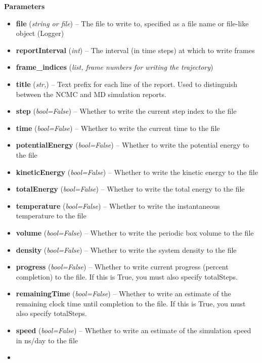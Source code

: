 \begin{description}
\begin{description}
\item
    \textbf{Parameters}
\begin{itemize}
\item
  \textbf{file} (\emph{string or file}) -- The file to write to,
  specified as a file name or file-like object (Logger)
\item
  \textbf{reportInterval} (\emph{int}) -- The interval (in time steps)
  at which to write frames
\item
  \textbf{frame\_indices} (\emph{list, frame numbers for writing the
  trajectory})
\item
  \textbf{title} (\emph{str,}) -- Text prefix for each line of the
  report. Used to distinguish between the NCMC and MD simulation
  reports.
\item
  \textbf{step} (\emph{bool=False}) -- Whether to write the current step
  index to the file
\item
  \textbf{time} (\emph{bool=False}) -- Whether to write the current time
  to the file
\item
  \textbf{potentialEnergy} (\emph{bool=False}) -- Whether to write the
  potential energy to the file
\item
  \textbf{kineticEnergy} (\emph{bool=False}) -- Whether to write the
  kinetic energy to the file
\item
  \textbf{totalEnergy} (\emph{bool=False}) -- Whether to write the total
  energy to the file
\item
  \textbf{temperature} (\emph{bool=False}) -- Whether to write the
  instantaneous temperature to the file
\item
  \textbf{volume} (\emph{bool=False}) -- Whether to write the periodic
  box volume to the file
\item
  \textbf{density} (\emph{bool=False}) -- Whether to write the system
  density to the file
\item
  \textbf{progress} (\emph{bool=False}) -- Whether to write current
  progress (percent completion) to the file. If this is True, you must
  also specify totalSteps.
\item
  \textbf{remainingTime} (\emph{bool=False}) -- Whether to write an
  estimate of the remaining clock time until completion to the file. If
  this is True, you must also specify totalSteps.
\item
  \textbf{speed} (\emph{bool=False}) -- Whether to write an estimate of
  the simulation speed in ns/day to the file
\item

\end{itemize}
\end{description}
\end{description}
